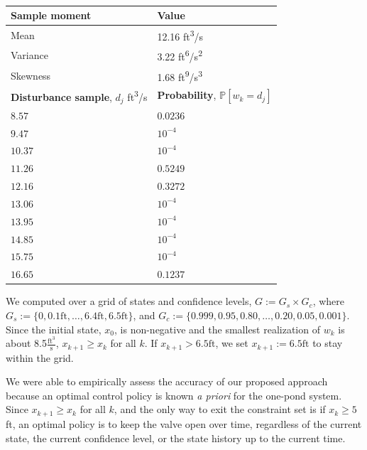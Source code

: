 \documentclass[letterpaper, 10 pt, conference]{ieeeconf}  %
\begin{document}
\begin{table}
\begin{center}
\caption{}
\begin{tabular}{| p{3.5cm} | p{3.5cm} |}
\hline
\bf{Sample moment} & \bf{Value}  \\ \hline
Mean & 12.16 ft\textsuperscript{3}/s \\ 
Variance & 3.22 ft\textsuperscript{6}/s\textsuperscript{2} \\ 
Skewness & 1.68 ft\textsuperscript{9}/s\textsuperscript{3} \\ 
\hline 
\textbf{Disturbance sample}, $d_j$ ft\textsuperscript{3}/s & \textbf{Probability}, $\mathbb{P}[w_k = d_j]$ \\ \hline
$8.57$ 		& $0.0236$ \\
$9.47$ 		& $10^{-4}$ \\
$10.37$ 		& $10^{-4}$ \\
$11.26$  & $0.5249$ \\ 
$12.16$ & $0.3272$ \\ 
$13.06$  & $10^{-4}$ \\ 
$13.95$  & $10^{-4}$ \\ 
$14.85$  & $10^{-4}$ \\ 
$15.75$  & $10^{-4}$ \\ 
$16.65$  & $0.1237$ \\ \hline
\end{tabular}
\begin{flushleft} \end{flushleft}
\label{dist}
\end{center}
\end{table}
%
We computed over a grid of states and confidence levels, $G := G_s \times G_c$, where  
$G_s := \{0, 0.1\text{ft}, \dots, 6.4\text{ft}, 6.5\text{ft}\}$,
and $G_c := \{0.999, 0.95, 0.80, \dots, 0.20, 0.05, 0.001\}$.
Since the initial state, $x_0$, is non-negative and the smallest realization of $w_k$ is about 8.5$\frac{\text{ft}^3}{\text{s}}$, 
$x_{k+1}\geq x_k$ for all $k$. 
If $x_{k+1} > 6.5\text{ft}$, we set $x_{k+1} := 6.5\text{ft}$ to stay within the grid.

We were able to empirically assess the accuracy of our proposed approach because an optimal control policy is known \textit{a priori} for the one-pond system.
Since $x_{k+1}\geq x_k$ for all $k$, and the only way to exit the constraint set is if $x_k \geq 5$ft,
an optimal policy is to keep the valve open over time, regardless of the current state, the current confidence level, or the state history up to the current time.
\end{document}
